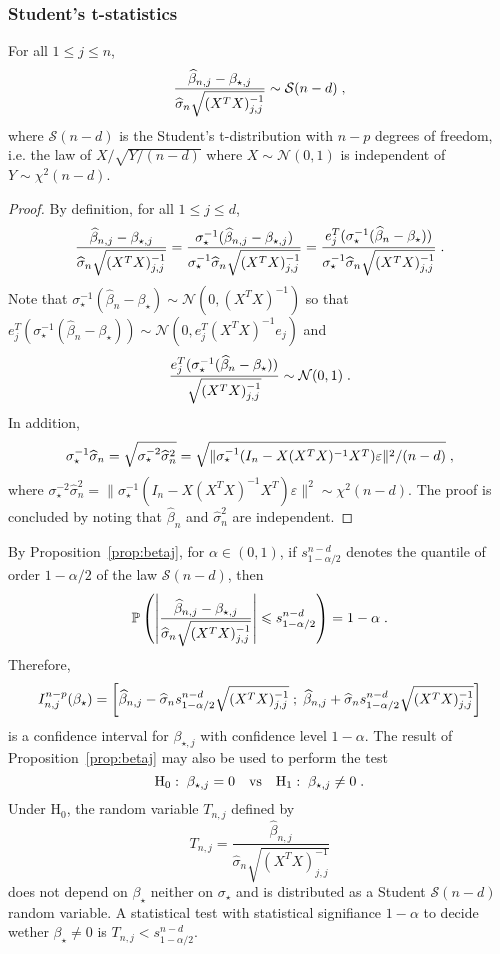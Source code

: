 \subsubsection*{Student's t-statistics}
\begin{shaded}
\begin{proposition}
\label{prop:betaj}
For all $1\leqslant j \leqslant n$,
\[
\frac{\widehat \beta_{n,j} -\beta_{\star,j}}{\widehat\sigma_{n}\sqrt{(X^TX)_{j,j}^{-1}}} \sim \mathcal{S}(n-d)\;,
\]
where $\mathcal{S}(n-d)$ is the Student's t-distribution with $n-p$ degrees of freedom, i.e. the law of $X/\sqrt{Y/(n-d)}$ where $X\sim\mathcal{N}(0,1)$ is independent of $Y\sim\chi^2(n-d)$.
\end{proposition}
\end{shaded}
\begin{proof}
By definition, for all $1\leqslant j \leqslant d$,  
\[
\frac{\widehat \beta_{n,j} -\beta_{\star,j}}{\widehat\sigma_{n}\sqrt{(X^TX)_{j,j}^{-1}}} = \frac{\sigma_\star^{-1}(\widehat \beta_{n,j} -\beta_{\star,j})}{\sigma_\star^{-1}\widehat\sigma_{n}\sqrt{(X^TX)_{j,j}^{-1}}} = \frac{e^T_j(\sigma_\star^{-1}(\widehat \beta_{n} -\beta_{\star}))}{\sigma_\star^{-1}\widehat\sigma_{n}\sqrt{(X^TX)_{j,j}^{-1}}}\;.
\]
Note that $\sigma_\star^{-1}(\widehat \beta_{n} -\beta_{\star}) \sim \mathcal{N}(0,(X^TX)^{-1})$ so that $e^T_j(\sigma_\star^{-1}(\widehat \beta_{n} -\beta_{\star}))\sim \mathcal{N}(0,e^T_j(X^TX)^{-1}e_j)$ and 
\[
\frac{e^T_j(\sigma_\star^{-1}(\widehat \beta_{n} -\beta_{\star}))}{\sqrt{(X^TX)_{j,j}^{-1}}}\sim\mathcal{N}(0,1)\;.
\]
In addition,
\[
\sigma_\star^{-1}\widehat\sigma_{n} = \sqrt{\sigma_\star^{-2}\widehat\sigma^2_{n}} = \sqrt{\|\sigma_\star^{-1}(I_n - X(X^TX)^{-1}X^T)\varepsilon\|^2/(n-d)}\;,
\]
where $\sigma_\star^{-2}\widehat\sigma^2_{n} = \|\sigma_\star^{-1}(I_n - X(X^TX)^{-1}X^T)\varepsilon\|^2 \sim \chi^2(n-d)$. The proof is concluded by noting that $\widehat \beta_n$ and  $\widehat\sigma^2_{n}$ are independent.
\end{proof}
By Proposition~\ref{prop:betaj}, for $\alpha\in(0,1)$, if $s_{1-\alpha/2}^{n-d}$ denotes the quantile of order $1-\alpha/2$ of the law $\mathcal{S}(n-d)$, then 
\[
\mathbb{P}\left(\left|\frac{\widehat \beta_{n,j} -\beta_{\star,j}}{\widehat\sigma_{n}\sqrt{(X^TX)_{j,j}^{-1}}}\right| \leqslant s_{1-\alpha/2}^{n-d}\right) = 1-\alpha\;.
\]
Therefore, 
\[
I^{n-p}_{n,j}(\beta_{\star}) = \left[\widehat \beta_{n,j} -\widehat\sigma_{n}s_{1-\alpha/2}^{n-d}\sqrt{(X^TX)_{j,j}^{-1}}\;;\; \widehat \beta_{n,j} + \widehat\sigma_{n}s_{1-\alpha/2}^{n-d}\sqrt{(X^TX)_{j,j}^{-1}}\right]
\]
 is a confidence interval for $\beta_{\star,j}$ with confidence level $1-\alpha$. The result of Proposition~\ref{prop:betaj} may also be used to perform the test 
\[
\mathrm{H}_0:\; \beta_{\star,j} = 0 \quad\mathrm{vs} \quad \mathrm{H}_1:\; \beta_{\star,j} \neq 0\;.
\]
Under $\mathrm{H}_0$, the random variable $T_{n,j}$ defined by 
\[
T_{n,j} = \frac{\widehat \beta_{n,j}}{\widehat\sigma_{n}\sqrt{(X^TX)_{j,j}^{-1}}} 
\] 
does not depend  on $\beta_{\star}$ neither on $\sigma_{\star}$ and is distributed as a Student $\mathcal{S}(n-d)$ random variable. A statistical test with statistical signifiance $1-\alpha$ to decide wether $\beta_{\star}\neq 0$ is $T_{n,j}<s_{1-\alpha/2}^{n-d}$. 
